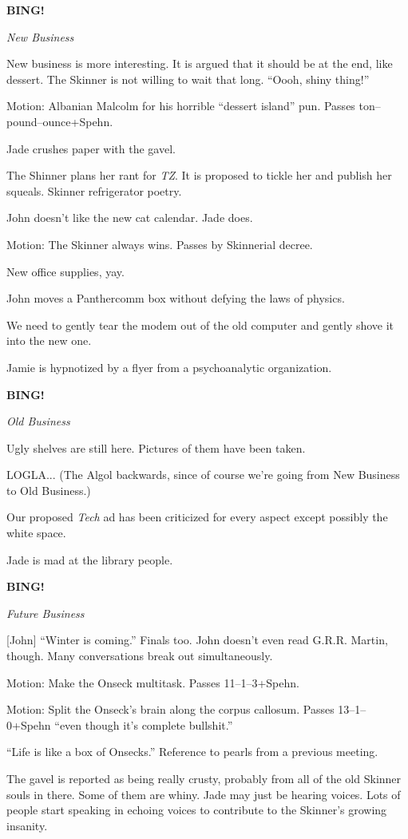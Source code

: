 \documentclass[12pt]{article}
\newcommand{\bing}{{\bf BING!} }
\newcommand{\goto}[1]{\bing \vskip 12pt \centerline{{\em{#1}}}}
\begin{document}
\goto{New Business}

New business is more interesting.  It is argued that it should be at
the end, like dessert.  The Skinner is not willing to wait that long.
``Oooh, shiny thing!''

Motion: Albanian Malcolm for his horrible ``dessert island'' pun.
Passes ton--pound--ounce+Spehn.

Jade crushes paper with the gavel.

The Shinner plans her rant for {\em TZ}.  It is proposed to tickle
her and publish her squeals.  Skinner refrigerator poetry.

John doesn't like the new cat calendar.  Jade does.

Motion: The Skinner always wins.  Passes by Skinnerial decree.

New office supplies, yay.

John moves a Panthercomm box without defying the laws of physics.

We need to gently tear the modem out of the old computer and gently
shove it into the new one.

Jamie is hypnotized by a flyer from a psychoanalytic organization.

\goto{Old Business}

Ugly shelves are still here.  Pictures of them have been taken.

LOGLA...  (The Algol backwards, since of course we're going from
New Business to Old Business.)

Our proposed {\em Tech} ad has been criticized for every aspect
except possibly the white space.

Jade is mad at the library people.

\goto{Future Business}

[John] ``Winter is coming.''  Finals too.  John doesn't even read
G.R.R. Martin, though.  Many conversations break out simultaneously.

Motion: Make the Onseck multitask.  Passes 11--1--3+Spehn.

Motion: Split the Onseck's brain along the corpus callosum.  Passes
13--1--0+Spehn ``even though it's complete bullshit.''

``Life is like a box of Onsecks.''  Reference to pearls from a
previous meeting.

The gavel is reported as being really crusty, probably from all of
the old Skinner souls in there.  Some of them are whiny.  Jade may
just be hearing voices.  Lots of people start speaking in echoing
voices to contribute to the Skinner's growing insanity.
\end{document}
